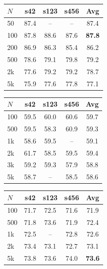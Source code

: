 \documentclass[11pt]{article}
\begin{document}
\begin{table}[h]
\centering
\small
\setlength{\tabcolsep}{4pt}
\begin{minipage}[t]{0.31\textwidth}
\centering
\begin{tabular}{@{}lcccc@{}}
\toprule
$N$ & s42 & s123 & s456 & Avg \\
\midrule
50 & 87.4 & -- & -- & 87.4 \\
100 & 87.8 & 88.6 & 87.6 & \textbf{87.8} \\
200 & 86.9 & 86.3 & 85.4 & 86.2 \\
500 & 78.6 & 79.1 & 79.8 & 79.2 \\
2k & 77.6 & 79.2 & 79.2 & 78.7 \\
5k & 75.9 & 77.6 & 77.8 & 77.1 \\
\bottomrule
\end{tabular}
\label{tab:full_sft_math}
\end{minipage}%
\hfill
\begin{minipage}[t]{0.31\textwidth}
\centering
\begin{tabular}{@{}lcccc@{}}
\toprule
$N$ & s42 & s123 & s456 & Avg \\
\midrule
100 & 59.5 & 60.0 & 60.6 & 59.7 \\
500 & 59.5 & 58.3 & 60.9 & 59.3 \\
1k & 58.6 & 59.5 & -- & 59.1 \\
2k & 61.7 & 58.5 & 59.5 & 59.4 \\
3k & 59.2 & 59.3 & 57.9 & 58.8 \\
5k & 58.7 & -- & 58.5 & 58.6 \\
\bottomrule
\end{tabular}
\label{tab:full_sft_med}
\end{minipage}%
\hfill
\begin{minipage}[t]{0.31\textwidth}
\centering
\begin{tabular}{@{}lcccc@{}}
\toprule
$N$ & s42 & s123 & s456 & Avg \\
\midrule
100 & 71.7 & 72.5 & 71.6 & 71.9 \\
500 & 71.8 & 73.6 & 71.9 & 72.4 \\
1k & 72.5 & -- & 72.8 & 72.6 \\
2k & 73.4 & 73.1 & 72.7 & 73.1 \\
5k & 73.8 & 73.6 & 74.0 & \textbf{73.6} \\
\bottomrule
\end{tabular}
\label{tab:full_sft_sci}
\end{minipage}


\end{table}
\end{document}
